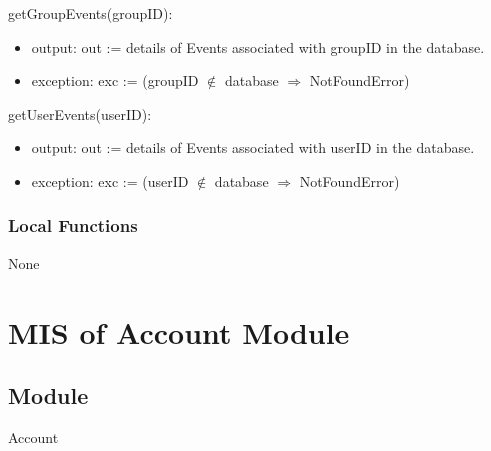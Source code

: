 \documentclass[12pt, titlepage]{article}
\begin{document}
\noindent getGroupEvents(groupID):
\begin{itemize}
\item output: out := details of Events associated with groupID in the database.
\item exception: exc := (groupID $\notin$ database $\Rightarrow$ NotFoundError)
\end{itemize}

\noindent getUserEvents(userID):
\begin{itemize}
\item output: out := details of Events associated with userID in the database.
\item exception: exc := (userID $\notin$ database $\Rightarrow$ NotFoundError)
\end{itemize}



\subsubsection{Local Functions}

None



\section{MIS of Account Module} \label{mB} 



\subsection{Module}

Account
\end{document}
